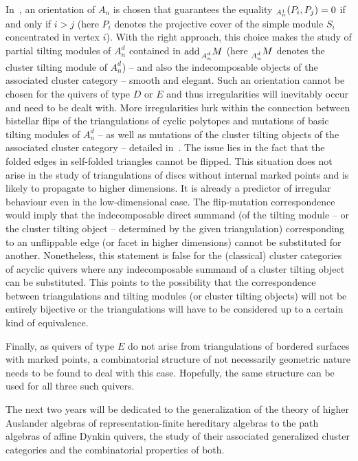 \documentclass[a4paper,oneside,svgnames]{amsart}
\theoremstyle{plain}
\theoremstyle{definition}
\let\hom\relax
\DeclareMathOperator{\add}{add}
\DeclareMathOperator{\hom}{Hom}
\begin{document}
 In~\cite[Section 3]{ot}, an orientation of $A_n$ is chosen that guarantees the
 equality $\hom_{A^{1}_n}(P_i,P_j) = 0$ if and only if $i > j$ (here $P_i$
 denotes the projective cover of the simple module $S_i$ concentrated in vertex
 $i$). With the right approach, this choice makes the study of partial tilting
 modules of $A^{d}_n$ contained in $\add \prescript{}{A^{d}_n}{M}$ (here
 $\prescript{}{A^{d}_n}{M}$ denotes the cluster tilting module of $A^{d}_n$) --
 and also the indecomposable objects of the associated cluster category --
 smooth and elegant. Such an orientation cannot be chosen for the quivers of
 type $D$ or $E$ and thus irregularities will inevitably occur and need to be
 dealt with. More irregularities lurk within the connection between bistellar
 flips of the triangulations of cyclic polytopes and mutations of basic tilting
 modules of $A^{d}_n$ -- as well as mutations of the cluster tilting objects of
 the associated cluster category -- detailed in~\cite[Sections 4 and 6]{ot}. The
 issue lies in the fact that the folded edges in self-folded triangles cannot be
 flipped. This situation does not arise in the study of triangulations of discs
 without internal marked points and is likely to propagate to higher dimensions.
 It is already a predictor of irregular behaviour even in the low-dimensional
 case. The flip-mutation correspondence would imply that the indecomposable
 direct summand (of the tilting module -- or the cluster tilting object --
 determined by the given triangulation) corresponding to an unflippable edge (or
 facet in higher dimensions) cannot be substituted for another. Nonetheless,
 this statement is false for the (classical) cluster categories of acyclic
 quivers where any indecomposable summand of a cluster tilting object can be
 substituted. This points to the possibility that the correspondence between
 triangulations and tilting modules (or cluster tilting objects) will not be
 entirely bijective or the triangulations will have to be considered up to a
 certain kind of equivalence.

 Finally, as quivers of type $E$ do not arise from triangulations of bordered
 surfaces with marked points, a combinatorial structure of not necessarily
 geometric nature needs to be found to deal with this case. Hopefully, the same
 structure can be used for all three such quivers.

 The next two years will be dedicated to the generalization of the theory of
 higher Auslander algebras of representation-finite hereditary algebras to the
 path algebras of affine Dynkin quivers, the study of their associated
 generalized cluster categories and the combinatorial properties of both.
\end{document}
